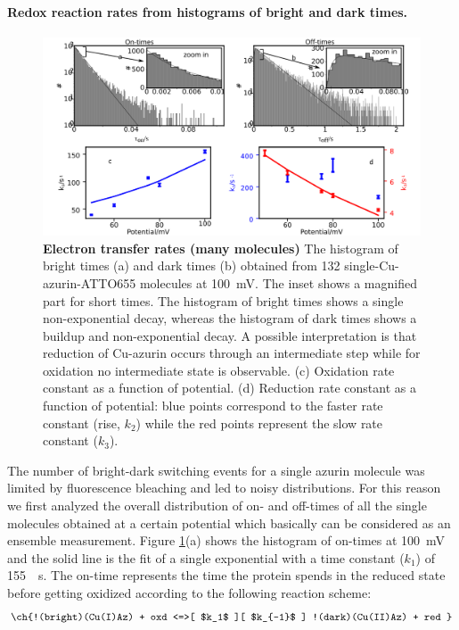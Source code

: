 \paragraph*{Redox reaction rates from histograms of bright and dark times.}
\begin{figure}
	\centering
	\includegraphics[width=\textwidth]{many_sm_hist}
	\caption{\textbf{Electron transfer rates (many molecules)} The histogram of bright times (a) and dark times (b) obtained from 132 single-Cu-azurin-ATTO655 molecules at \SI{100}{\mV}. The inset shows a magnified part for short times.
	The histogram of bright times shows a single non-exponential decay, whereas the histogram of dark times shows a buildup and non-exponential decay. A possible interpretation is that reduction of Cu-azurin occurs through an intermediate step while for oxidation no intermediate state is observable.
	(c) Oxidation rate constant as a function of potential. 
	(d) Reduction rate constant as a function of potential: blue points correspond to the faster rate constant (rise, $k_2$) while the red points represent the slow rate constant ($k_3$).}
	\label{fig:many_sm_hist}
\end{figure}
The number of bright-dark switching events for a single azurin molecule was limited by fluorescence bleaching and led to noisy distributions.
For this reason we first analyzed the overall distribution of on- and off-times of all the single molecules obtained at a certain potential which basically can be considered as an ensemble measurement.
Figure \ref{fig:many_sm_hist}(a) shows the histogram of on-times at \SI{100}{\mV} and the solid line is the fit of a single exponential with a time constant ($k_{1}$) of \SI{155}{\per\s}.
The on-time represents the time the protein spends in the reduced state before getting oxidized according to the following reaction scheme:
\begin{align}
	\ch{!(bright)(Cu(I)Az) + oxd <=>[ $k_1$ ][ $k_{-1}$ ] !(dark)(Cu(II)Az) + red }
	\label{eq:oxidation}
\end{align}
